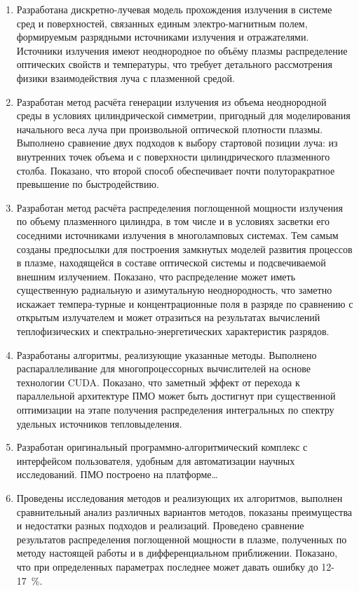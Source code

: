 \begin{enumerate}
	\item Разработана дискретно-лучевая модель прохождения излучения в системе сред и поверхностей, связанных единым электро-магнитным полем, формируемым разрядными источниками излучения и отражателями.
	Источники излучения имеют неоднородное по объёму плазмы распределение оптических свойств и температуры, что требует детального рассмотрения  физики  взаимодействия луча с плазменной средой.

	\item Разработан метод расчёта генерации излучения из объема неоднородной среды в условиях цилиндрической симметрии, пригодный для моделирования начального веса луча при произвольной оптической плотности плазмы.
	Выполнено сравнение двух подходов к выбору стартовой позиции луча: из внутренних точек объема и с поверхности цилиндрического плазменного столба.
	Показано, что второй способ обеспечивает почти полуторакратное превышение по быстродействию.

	\item Разработан метод расчёта распределения поглощенной мощности излучения по объему плазменного цилиндра, в том числе и в условиях засветки его соседними источниками излучения в многоламповых системах.
	Тем самым созданы предпосылки для построения замкнутых  моделей развития процессов в плазме, находящейся  в составе оптической системы и подсвечиваемой внешним излучением. Показано, что распределение может иметь существенную радиальную и азимутальную неоднородность, что заметно искажает темпера-турные и концентрационные поля в разряде по сравнению с открытым излучателем и может отразиться на результатах вычислений теплофизических и спектрально-энергетических характеристик разрядов.

	\item Разработаны алгоритмы, реализующие указанные методы.
	Выполнено распараллеливание для многопроцессорных вычислителей на основе технологии CUDA.
	Показано, что заметный эффект от перехода к параллельной архитектуре ПМО может быть достигнут при существенной оптимизации на этапе получения распределения интегральных по спектру удельных источников тепловыделения.

	\item Разработан оригинальный программно-алгоритмический комплекс с интерфейсом пользователя, удобным для автоматизации научных исследований.
	ПМО построено на платформе…

	\item Проведены исследования методов и реализующих их алгоритмов, выполнен сравнительный анализ различных вариантов методов, показаны преимущества и недостатки разных подходов и реализаций.
	Проведено сравнение результатов распределения поглощенной мощности в плазме, полученных по методу настоящей работы и в дифференциальном приближении.
	Показано, что при определенных параметрах последнее может давать ошибку до 12-17~\%.


\end{enumerate}
